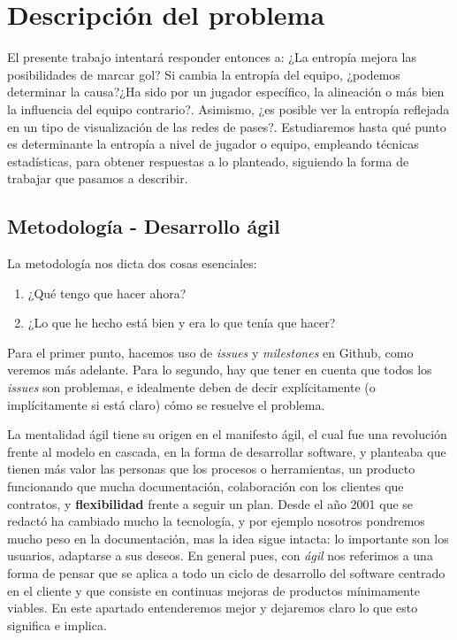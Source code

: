 \chapter{Descripción del problema}
El presente trabajo intentará responder entonces a: ¿La entropía mejora las posibilidades 
de marcar gol? Si cambia la entropía del equipo, ¿podemos determinar la causa?¿Ha sido por un jugador 
específico, la alineación o más bien la influencia del equipo 
contrario?. Asimismo, ¿es posible ver la entropía reflejada en un tipo de visualización de 
las redes de pases?. Estudiaremos hasta qué punto es determinante la 
entropía a nivel de jugador o equipo, empleando técnicas estadísticas, para obtener respuestas a lo planteado, 
siguiendo la forma de trabajar que pasamos a describir.

\section{Metodología - Desarrollo ágil}
La metodología nos dicta dos cosas esenciales:
\begin{enumerate}
    \item ¿Qué tengo que hacer ahora?
    \item ¿Lo que he hecho está bien y era lo que tenía que hacer?
\end{enumerate}

Para el primer punto, hacemos uso de \textit{issues} y \textit{milestones} en Github, 
como veremos más adelante. Para lo segundo, hay que tener en cuenta que todos 
los \textit{issues} son problemas, e idealmente deben de decir explícitamente 
(o implícitamente si está claro) cómo se resuelve el problema.

La mentalidad ágil tiene su origen en el manifesto ágil\cite{manifesto-agil}, el cual fue una revolución frente 
al modelo en cascada,
en la forma de desarrollar software, y planteaba que tienen más valor las personas que 
los procesos o herramientas, un producto funcionando que mucha documentación, colaboración 
con los clientes que contratos, y \textbf{flexibilidad} frente a seguir un plan. Desde el 
año 2001 que se redactó ha cambiado mucho la tecnología, y por ejemplo nosotros pondremos 
mucho peso en la documentación, mas la idea sigue intacta: lo importante son los usuarios, 
adaptarse a sus deseos. En general pues, con \textit{ágil} nos referimos a una forma de pensar que se aplica 
a todo un ciclo de desarrollo del software centrado en el cliente y que consiste en 
continuas mejoras de productos mínimamente viables\cite{agile-science}.
En este apartado entenderemos mejor y dejaremos claro lo que esto significa e implica.


